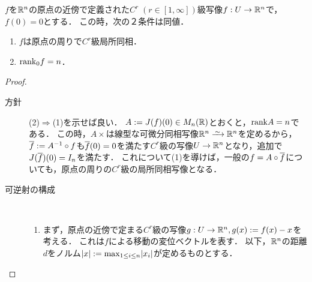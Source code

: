 \documentclass[uplatex,dvipdfmx]{jsreport}
\begin{document}
\begin{theorem}[逆写像定理]
    $f$を$\mathbb{R}^n$の原点の近傍で定義された$C^r\;(r\in[1,\infty])$級写像$f:U\to\mathbb{R}^n$で，$f(0)=0$とする．
    この時，次の２条件は同値．
    \begin{enumerate}
        \item $f$は原点の周りで$C^r$級局所同相．
        \item $\mathrm{rank}_0f=n$．
    \end{enumerate}
\end{theorem}
\begin{proof}\mbox{}
    \begin{description}
        \item[方針] 
        (2)$\Rightarrow$(1)を示せば良い．
        $A:=J(f)(0)\in M_n(\mathbb{R})$とおくと，$\mathrm{rank} A=n$である．
        この時，$A\times$は線型な可微分同相写像$\R^n\iso\R^n$を定めるから，$\overline{f}:=A^{-1}\circ f$も$\overline{f}(0)=0$を満たす$C^r$級の写像$U\to\mathbb{R}^n$となり，追加で$J(\overline{f})(0)=I_n$を満たす．
        これについて(1)を導けば，一般の$f=A\circ\overline{f}$についても，原点の周りの$C^r$級の局所同相写像となる．
        \item[可逆射の構成] \mbox{}\\
        \begin{enumerate}
            \item まず，原点の近傍で定まる$C^r$級の写像$g:U\to\mathbb{R}^n,g(x):=f(x)-x$を考える．
            これは$f$による移動の変位ベクトルを表す．
            以下，$\mathbb{R}^n$の距離$d$をノルム$\lvert x\rvert:=\max_{1\le i\le n}\lvert x_i\rvert$が定めるものとする．


\end{enumerate}
\end{description}
\end{proof}
\end{document}
